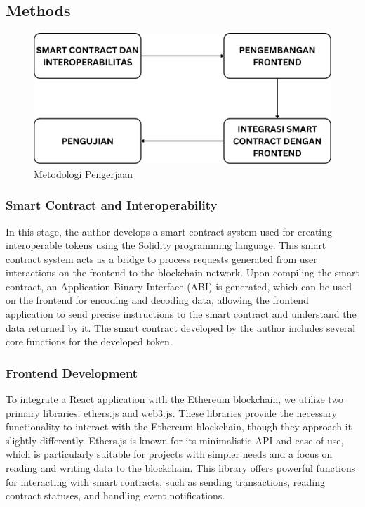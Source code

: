 \subsection{Methods}
\begin{figure}[H] \centering
  \includegraphics[scale=0.20]{gambar/metodologi_new.png}
  \caption{Metodologi Pengerjaan}
  \label{fig:metodologi}
\end{figure}

\subsubsection{Smart Contract and Interoperability}
In this stage, the author develops a smart contract system used for creating interoperable tokens using the Solidity programming language. This smart contract system acts as a bridge to process requests generated from user interactions on the frontend to the blockchain network. Upon compiling the smart contract, an Application Binary Interface (ABI) is generated, which can be used on the frontend for encoding and decoding data, allowing the frontend application to send precise instructions to the smart contract and understand the data returned by it. The smart contract developed by the author includes several core functions for the developed token.

\subsubsection{Frontend Development} 
To integrate a React application with the Ethereum blockchain, we utilize two primary libraries: ethers.js and web3.js. These libraries provide the necessary functionality to interact with the Ethereum blockchain, though they approach it slightly differently. Ethers.js is known for its minimalistic API and ease of use, which is particularly suitable for projects with simpler needs and a focus on reading and writing data to the blockchain. This library offers powerful functions for interacting with smart contracts, such as sending transactions, reading contract statuses, and handling event notifications.


